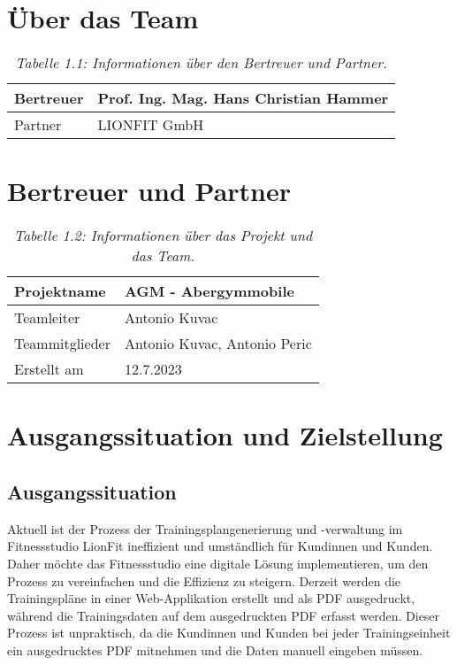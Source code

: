 \section{Über das Team}
\begin{table}[h]
    \centering
    \caption{\textit{Tabelle 1.1: Informationen über den Bertreuer und Partner.}}
    \begin{tabular}{|p{}|p{}|}
        \hline
        Bertreuer & Prof. Ing. Mag. Hans Christian Hammer \\ \hline
        Partner & LIONFIT GmbH \\ \hline
    \end{tabular}
\end{table}

\section{Bertreuer und Partner}
\begin{table}[h]
    \centering
    \caption{\textit{Tabelle 1.2: Informationen über das Projekt und das Team.}}
    \begin{tabular}{|p{}|p{}|}
        \hline
        Projektname & AGM - Abergymmobile \\ \hline
        Teamleiter & Antonio Kuvac \\ \hline
        Teammitglieder & Antonio Kuvac, Antonio Peric \\ \hline
        Erstellt am & 12.7.2023 \\ \hline
    \end{tabular}
\end{table}

\section{Ausgangssituation und Zielstellung}

\subsection{Ausgangssituation}
Aktuell ist der Prozess der Trainingsplangenerierung und -verwaltung im Fitnessstudio LionFit ineffizient und umständlich für Kundinnen und Kunden. Daher möchte das Fitnessstudio eine digitale Lösung implementieren, um den Prozess zu vereinfachen und die Effizienz zu steigern. Derzeit werden die Trainingspläne in einer Web-Applikation erstellt und als PDF ausgedruckt, während die Trainingsdaten auf dem ausgedruckten PDF erfasst werden. Dieser Prozess ist unpraktisch, da die Kundinnen und Kunden bei jeder Trainingseinheit ein ausgedrucktes PDF mitnehmen und die Daten manuell eingeben müssen.

